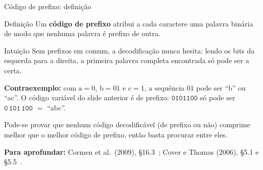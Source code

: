 \documentclass[aspectratio=169,xcolor=table]{beamer}
\newcommand{\fonte}[1]{%
  \vfill
  {\tiny\color{gray!55!black}\textbf{Para aprofundar:} #1\par}%
}
\begin{document}
\begin{frame}{Código de prefixo: definição}
  \begin{block}{Definição}
    Um \textbf{código de prefixo} atribui a cada caractere uma palavra binária de modo que
    nenhuma palavra é prefixo de outra.
  \end{block}
  \begin{exampleblock}{Intuição}
    Sem prefixos em comum, a decodificação nunca hesita: lendo os bits da esquerda para a
    direita, a primeira palavra completa encontrada só pode ser a certa.
  \end{exampleblock}
  {\small\textbf{Contraexemplo:} com $\mathrm{a} = 0$, $\mathrm{b} = 01$ e
  $\mathrm{c} = 1$, a sequência $01$ pode ser ``b'' ou ``ac''. O código variável do slide
  anterior é de prefixo: $\texttt{0101100}$ só pode ser $\texttt{0}\,\texttt{101}\,\texttt{100}$
  $=$ ``abc''.\par}
  \smallskip
  {\scriptsize Pode-se provar que nenhum código decodificável (de prefixo ou não) comprime
  melhor que o melhor código de prefixo, então basta procurar entre eles.\par}
  \fonte{Cormen et al.\ (2009), \S 16.3~\cite{cormen2009introduction};
    Cover e Thomas (2006), \S 5.1 e \S 5.5~\cite{cover2006elements}.}
\end{frame}
\end{document}
